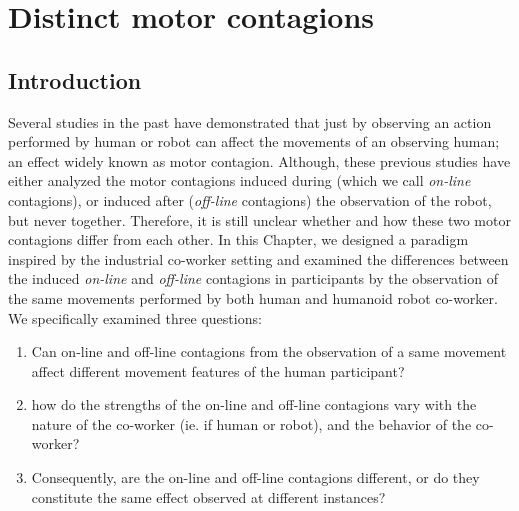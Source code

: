 
{\color{blue}\chapter{Distinct motor contagions}\label{distinct motor contagion}}

\section{Introduction}

Several studies in the past have demonstrated that just by observing an action performed by human or robot can affect the movements of an observing human; an effect widely known as motor contagion. Although, these previous studies have either analyzed the motor contagions induced during (which we call \emph{on-line} contagions), or induced after (\emph{off-line} contagions) the observation of the robot, but never together. Therefore, it is still unclear whether and how these two motor contagions differ from each other. In this Chapter, we designed a paradigm inspired by the industrial co-worker setting and examined the differences between the induced \textit{on-line} and \textit{off-line} contagions in participants by the observation of the same movements performed by both human and humanoid robot co-worker. We specifically examined three questions:

\begin{enumerate}
	\item Can on-line and off-line contagions from the observation of a same movement affect different movement features of the human participant?
	\item how do the strengths of the on-line and off-line contagions vary with the nature of the co-worker (ie. if human or robot), and the behavior of the co-worker?
	\item Consequently, are the on-line and off-line contagions different, or do they constitute the same effect observed at different instances?
\end{enumerate}



